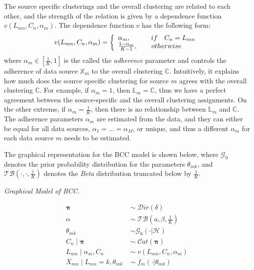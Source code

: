 The source specific clusterings and the overall clustering are related to each other, and the strength of the relation is given by a dependence function $v(L_{mn}, C_{n}, \alpha_{m})$. The dependence function $v$ has the following form:
\begin{equation}
	v(L_{mn}, C_{n}, \alpha_{m}) = \left\{
	\begin{array}{l l}
		\alpha_{m},\quad \quad \quad if\quad C_{n} = L_{mn}\\
		\frac{1-\alpha_{m}}{K-1},\quad \quad otherwise
	\end{array}\right.
\end{equation}
where $\alpha_{m} \in [\frac{1}{K}, 1]$ is the called the \emph{adherence} parameter and controls the adherence of data source $\mathbb{X}_m$ to the overall clustering $\mathbb{C}$. Intuitively, it explains how much does the source specific clustering for source $m$ agrees with the overall clustering $\mathbb{C}$. For example, if $\alpha_{m} = 1$, then $\mathbb{L}_{m} = \mathbb{C}$, thus we have a perfect agreement between the source-specific and the overall clustering assignments. On the other extreme, if $\alpha_{m} = \frac{1}{K}$, then there is no relationship between $\mathbb{L}_{m}$ and $\mathbb{C}$. The adherence parameters $\alpha_{m}$ are estimated from the data, and they can either be equal for all data sources, \ie $\alpha_{1} = ... = \alpha_{M}$, or unique, and thus a different $\alpha_{m}$ for each data source $m$ needs to be estimated. 


The graphical representation for the BCC model is shown below, where $\mathcal{G}_{0}$ denotes the prior probability distribution for the parameters $\theta_{mk}$, and $\mathcal{TB}(\cdot, \cdot, \frac{1}{K})$ denotes the \emph{Beta} distribution truncated below by $\frac{1}{K}$.

\vspace*{5mm}
\begin{minipage}{0.5\textwidth}%
  \hfill
  \begin{center}
	
	\emph{Graphical Model of BCC.}
  \end{center}
\end{minipage}
\begin{minipage}{0.4\textwidth}%
  \begin{equation*}
  	\begin{aligned}
  		\mathbf{\pi} \; & \sim \; \mathcal{D}ir(\delta) \\
  		\alpha \; & \sim \; \mathcal{TB}(\mathit{a}, \beta, \frac{1}{K}) \\
  		\theta_{mk} \; & \sim \mathcal{G}_{0}(\cdot | \mathcal{H}) \\
  		C_{n} \mid \mathbf{\pi} \; & \sim \; \mathcal{C}at(\mathbf{\pi}) \\
  		L_{mn} \mid \alpha_{m}, C_{n} \; & \sim \; v(L_{mn}, C_{n}, \alpha_{m}) \\
  		X_{mn} \mid L_{mn}=k,\theta_{mk} \; & \sim \; f_{m}(\cdot | \theta_{mk}) 
  	\end{aligned} 
  \end{equation*} 
\end{minipage}
\vspace*{5mm}


